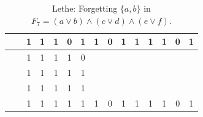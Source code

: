 \begin{table}[!tb]
\begin{tabular}{|c|c|c|c|c|c|c|c|c|c|c|c|c|c|c|}
        \rowcolor{yellow!40}  &  & 1 & 1 & 1 & 0 & 1 & 1 & 0 & 1 & 1 & 1 & 1 & 0 & 1 \\ \hline
        \rowcolor{gray!40}  &  & 1 & 1 & 1 & 1 & 0 &  &  &  &  &  &  &  &  \\ \hline
        \rowcolor{gray!40}  &  & 1 & 1 & 1 & 1 & 1 &  &  &  &  &  &  &  &  \\ \hline
        \rowcolor{gray!40}  &  & 1 & 1 & 1 & 1 & 1 &  &  &  &  &  &  &  &  \\ \hline
        \rowcolor{gray!40}  &  & 1 & 1 & 1 & 1 & 1 & 1 & 0 & 1 & 1 & 1 & 1 & 0 & 1 \\ \hline
    \end{tabular}
    \caption{Lethe: Forgetting $\{a, b\}$ in $F_{7} = (a \lor b) \land (c \lor d) \land (e \lor f)$.}
    \label{tab:lethe-F7-ab}
\end{table}

